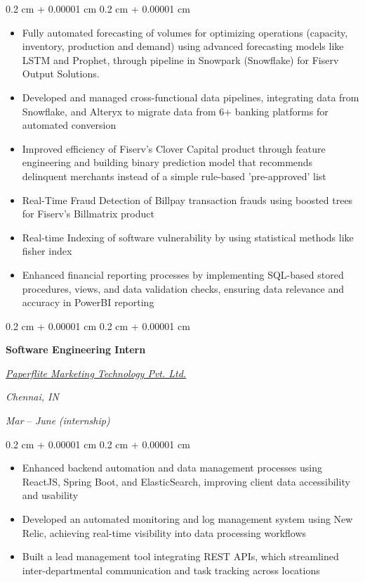 \documentclass[10pt, letterpaper]{article}
\newenvironment{highlights}{
    \begin{itemize}[
        topsep=0.10 cm,
        parsep=0.10 cm,
        partopsep=0pt,
        itemsep=0pt,
        leftmargin=0.4 cm + 10pt
    ]
}{
    \end{itemize}
} %
\newenvironment{onecolentry}{
    \begin{adjustwidth}{
        0.2 cm + 0.00001 cm
    }{
        0.2 cm + 0.00001 cm
    }
}{
    \end{adjustwidth}
} %
\newenvironment{twocolentry}[2][]{
    \onecolentry
    \def\secondColumn{#2}
    \setcolumnwidth{\fill, 10 cm}
    \begin{paracol}{2}
}{
    \switchcolumn \raggedleft \secondColumn
    \end{paracol}
    \endonecolentry
} %
\begin{document}
\vspace{0.10 cm}
\begin{onecolentry}
    \begin{highlights}
        \item Fully automated forecasting of volumes for optimizing operations (capacity, inventory, production and demand) using advanced forecasting models like LSTM and Prophet, through pipeline in Snowpark (Snowflake) for Fiserv Output Solutions.  
        \item Developed and managed cross-functional data pipelines, integrating data from Snowflake, and Alteryx to migrate data from 6+ banking platforms for automated conversion
        \item Improved efficiency of Fiserv's Clover Capital product through feature engineering and building binary prediction model that recommends delinquent merchants instead of a simple rule-based 'pre-approved' list 
        \item Real-Time Fraud Detection of Billpay transaction frauds using boosted trees for Fiserv's Billmatrix product
        \item Real-time Indexing of software vulnerability by using statistical methods like fisher index
        \item Enhanced financial reporting processes by implementing SQL-based stored procedures, views, and data validation checks, ensuring data relevance and accuracy in PowerBI reporting
    \end{highlights}
\end{onecolentry}

\vspace{0.2 cm}

\begin{twocolentry}{
\textit{Chennai, IN}    

\textit{Mar} \text{2021} – \textit{June} \text{2021} \textit{(internship)}}
    \textbf{Software Engineering Intern}
    
    \href{https://www.paperflite.com/}{\textit{Paperflite Marketing Technology Pvt. Ltd.}}
    
\end{twocolentry}

\vspace{0.10 cm}
\begin{onecolentry}
    \begin{highlights}
        \item Enhanced backend automation and data management processes using ReactJS, Spring Boot, and ElasticSearch, improving client data accessibility and usability
        \item Developed an automated monitoring and log management system using New Relic, achieving real-time visibility into data processing workflows
        \item Built a lead management tool integrating REST APIs, which streamlined inter-departmental communication and task tracking across locations
    \end{highlights}
\end{onecolentry}
\end{document}
